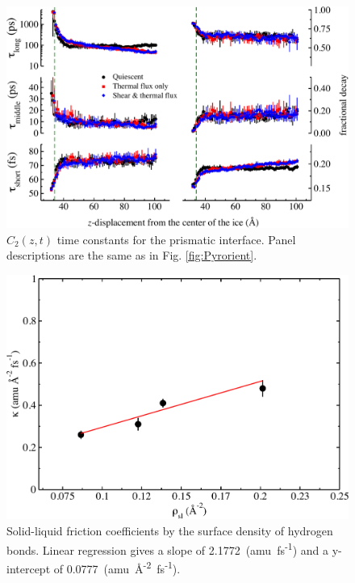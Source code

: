 \documentclass[journal = jpccck, manuscript = suppinfo]{achemso}
\begin{document}
\begin{figure}
\includegraphics[width=\linewidth]{Pri_lcorrz}
\caption{\label{fig:Porient} $C_2(z,t)$ time constants for the prismatic
  interface.  Panel descriptions are the same as in
  Fig. \ref{fig:Pyrorient}.}
\end{figure}
\begin{figure}
\includegraphics[width=\linewidth]{hb}
\caption{\label{fig:hbPlot} Solid-liquid friction coefficients by the
  surface density of hydrogen bonds. Linear regression gives a slope
  of 2.1772~(amu~fs\textsuperscript{-1}) and a y-intercept of
  0.0777~(amu~\AA\textsuperscript{-2}~fs\textsuperscript{-1}).} 
\end{figure}                                            
\end{document}
